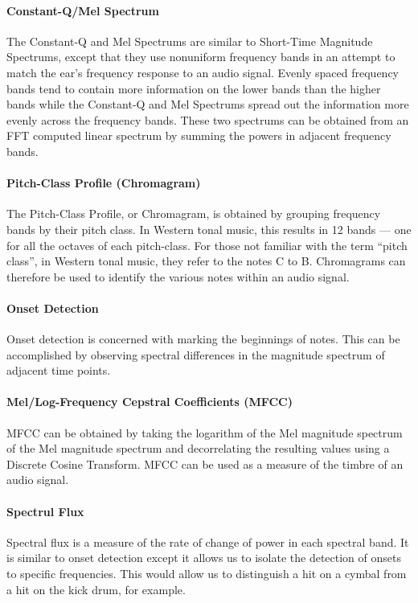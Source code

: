 \documentclass[../main_report2.tex]{subfiles}
\begin{document}
\paragraph{Constant-Q/Mel Spectrum}
The Constant-Q and Mel Spectrums are similar to Short-Time Magnitude Spectrums, except that they use nonuniform frequency bands in an attempt to match the ear's frequency response to an audio signal. Evenly spaced frequency bands tend to contain more information on the lower bands than the higher bands while the Constant-Q and Mel Spectrums spread out the information more evenly across the frequency bands. These two spectrums can be obtained from an FFT computed linear spectrum by summing the powers in adjacent frequency bands.

\paragraph{Pitch-Class Profile (Chromagram)}
The Pitch-Class Profile, or Chromagram, is obtained by grouping frequency bands by their pitch class. In Western tonal music, this results in 12 bands --- one for all the octaves of each pitch-class. For those not familiar with the term ``pitch class'', in Western tonal music, they refer to the notes C to B. Chromagrams can therefore be used to identify the various notes within an audio signal.

\paragraph{Onset Detection}
Onset detection is concerned with marking the beginnings of notes. This can be accomplished by observing spectral differences in the magnitude spectrum of adjacent time points.

\paragraph{Mel/Log-Frequency Cepstral Coefficients (MFCC)}
MFCC can be obtained by taking the logarithm of the Mel magnitude spectrum of the Mel magnitude spectrum and decorrelating the resulting values using a Discrete Cosine Transform. MFCC can be used as a measure of the timbre of an audio signal.

\paragraph{Spectrul Flux}
Spectral flux is a measure of the rate of change of power in each spectral band. It is similar to onset detection except it allows us to isolate the detection of onsets to specific frequencies. This would allow us to distinguish a hit on a cymbal from a hit on the kick drum, for example.
\end{document}
